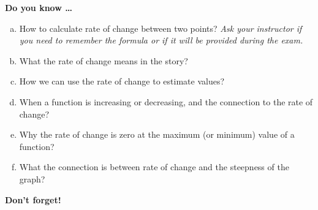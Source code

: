 \newpage



\bigskip

\noindent \textbf{Do you know \ldots} %

\begin{enumerate} [(a)]
\item How to calculate rate of change between two points?   \emph{Ask your instructor if you need to remember the formula or if it will be provided during the exam.} 
\item What the rate of change means in the story?   
\item How we can use the rate of change to estimate values?   
\item When a function is increasing or decreasing, and the connection to the rate of change?   
\item Why the rate of change is zero at the maximum (or minimum) value of a function?   
\item What the connection is between rate of change and the steepness of the graph?  
\end{enumerate}

\bigskip

\noindent \textbf{Don't forget!}
